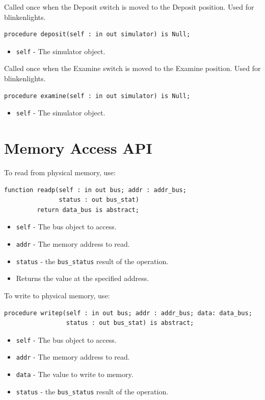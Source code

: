 \documentclass[10pt, openany]{book}
\newcommand{\keyword}[1]{\texttt{#1}}
\newcommand{\datatype}[1]{\texttt{#1}}
\begin{document}
Called once when the Deposit switch is moved to the Deposit position.  Used for blinkenlights.
\begin{lstlisting}
procedure deposit(self : in out simulator) is Null;
\end{lstlisting}
\begin{itemize}
  \item \keyword{self} - The simulator object.
\end{itemize}

Called once when the Examine switch is moved to the Examine position.  Used for blinkenlights.
\begin{lstlisting}
procedure examine(self : in out simulator) is Null;
\end{lstlisting}
\begin{itemize}
  \item \keyword{self} - The simulator object.
\end{itemize}

\section{Memory Access API}

To read from physical memory, use:
\begin{lstlisting}
function readp(self : in out bus; addr : addr_bus;
               status : out bus_stat)
         return data_bus is abstract;
\end{lstlisting}
\begin{itemize}
  \item \keyword{self} - The bus object to access.
  \item \keyword{addr} - The memory address to read.
  \item \keyword{status} - the \datatype{bus\_status} result of the operation.
  \item Returns the value at the specified address.
\end{itemize}

To write to physical memory, use:
\begin{lstlisting}
procedure writep(self : in out bus; addr : addr_bus; data: data_bus;
                 status : out bus_stat) is abstract;
\end{lstlisting}
\begin{itemize}
  \item \keyword{self} - The bus object to access.
  \item \keyword{addr} - The memory address to read.
  \item \keyword{data} - The value to write to memory.
  \item \keyword{status} - the \datatype{bus\_status} result of the operation.
\end{itemize}
\end{document}

